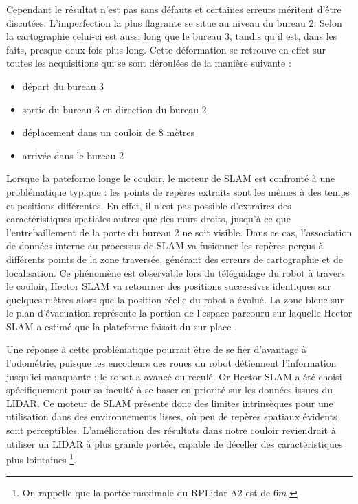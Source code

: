   Cependant le résultat n'est pas sans défauts et certaines erreurs méritent d'être discutées. 
  L'imperfection la plus flagrante se situe au niveau du bureau 2. 
  Selon la cartographie celui-ci est aussi long que le bureau 3, tandis qu'il est, dans les faits, presque deux fois plus long. 
  Cette déformation se retrouve en effet sur toutes les acquisitions qui se sont déroulées de la manière suivante : 
  \begin{itemize}
   \item départ du bureau 3
   \item sortie du bureau 3 en direction du bureau 2
   \item déplacement dans un couloir de 8 mètres
   \item arrivée dans le bureau 2
  \end{itemize}

  Lorsque la pateforme longe le couloir, le moteur de SLAM est confronté à une problématique typique : les points de repères extraits sont les mêmes à des temps et positions différentes. 
  En effet, il n'est pas possible d'extraires des caractéristiques spatiales autres que des murs droits, jusqu'à ce que l'entrebaillement de la porte du bureau 2 ne soit visible. 
  Dans ce cas, l'association de données interne au processus de SLAM va fusionner les repères perçus à différents points de la zone traversée, générant des erreurs de cartographie et de localisation.  
  Ce phénomène est observable lors du téléguidage du robot à travers le couloir, \gls{Hector SLAM} va retourner des positions successives identiques sur quelques mètres alors que la position réelle du robot a évolué.
  La zone bleue sur le plan d'évacuation représente la portion de l'espace parcouru sur laquelle \gls{Hector SLAM} a estimé que la plateforme faisait du \og sur-place \fg{}. 
  
  Une réponse à cette problématique pourrait être de se fier d'avantage à l'odométrie, puisque les encodeurs des roues du robot détiennent l'information jusqu'ici manquante : le robot a avancé ou reculé. 
  Or Hector SLAM a été choisi spécifiquement pour sa faculté à se baser en priorité sur les données issues du LIDAR. 
  Ce moteur de SLAM présente donc des limites intrinsèques pour une utilisation dans des environnements lisses, où peu de repères spatiaux évidents sont perceptibles.  
  L'amélioration des résultats dans notre couloir reviendrait à utiliser un LIDAR à plus grande portée, capable de déceller des caractéristiques plus lointaines
  \footnote{On rappelle que la portée maximale du RPLidar A2 est de $6m$.}.
  
